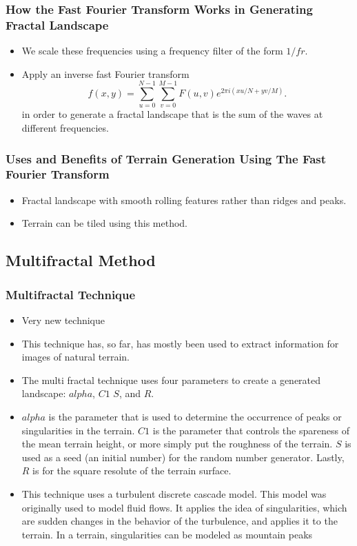 \documentclass{beamer}
\begin{document}
\begin{frame}
\frametitle{How the Fast Fourier Transform Works in Generating Fractal Landscape}
\begin{itemize}
\item We scale these frequencies using a frequency filter of the form $1/fr$.
\item Apply an inverse fast Fourier transform
$$f(x,y)=\displaystyle\sum\limits_{u=0}^{N-1} \displaystyle\sum\limits_{v=0}^{M-1} F(u,v)e^{2\pi i(xu/N+yv/M)}.$$ 
in order to generate a fractal landscape that is the sum of the waves at different frequencies. 
\end{itemize}
\end{frame}

\begin{frame}
\frametitle{Uses and Benefits of Terrain Generation Using The Fast Fourier Transform}
\begin{itemize}
\item Fractal landscape with smooth rolling features rather than ridges and peaks.
\item Terrain can be tiled using this method.
\end{itemize}
\end{frame}

\subsection{Multifractal Method}

\begin{frame}
 \frametitle{Multifractal Technique}
\begin{itemize}
\item Very new technique
\item This technique has, so far, has mostly been used to extract information for images of natural terrain. 
\item The multi fractal technique uses four parameters to create a generated landscape: $alpha$, $C1$ $S$, and $R$. 
\item $alpha$ is the parameter that is used to determine the occurrence of peaks or singularities in the terrain. $C1$ is the parameter that controls the spareness of the mean terrain height, or more simply put the roughness of the terrain. $S$ is used as a seed (an initial number) for the random number generator. Lastly, $R$ is for the square resolute of the terrain surface.
\item This technique uses a turbulent discrete cascade model. This model was originally used to model fluid flows. It applies the idea of singularities, which are sudden changes in the behavior of the turbulence, and applies it to the terrain. In a terrain, singularities can be modeled as mountain peaks
\end{itemize}
\end{frame}
\end{document}
